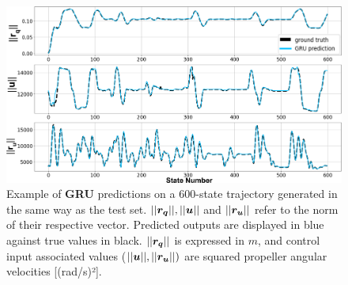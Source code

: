 \begin{figure}[b]
    \centering
    \includegraphics[width=0.99\linewidth]{figures/learning_quadrotor/long_pred.png}
    \caption{Example of \textbf{GRU} predictions on a 600-state trajectory generated in the same way as the test set. $||\boldsymbol{r_q}||, ||\boldsymbol{u}||$ and $||\boldsymbol{r_u}||$ refer to the norm of their respective vector. Predicted outputs are displayed in blue against true values in black. $||\boldsymbol{r_q}||$ is expressed in $m$, and control input associated values ($||\boldsymbol{u}||,||\boldsymbol{r_u}||)$ are squared propeller angular velocities [(rad/s)²].}
    \label{fig:long_test}
\end{figure}

